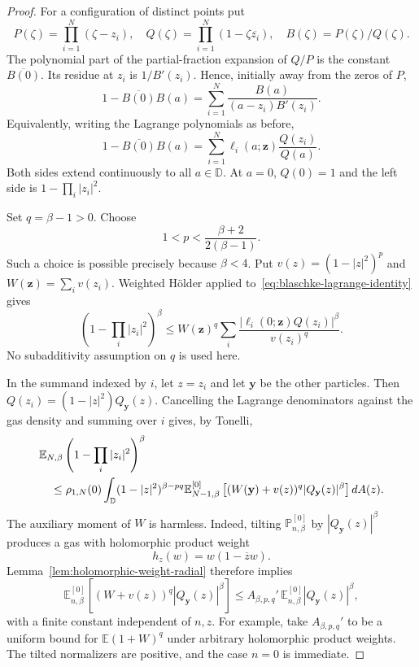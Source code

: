\documentclass[11pt,a4paper]{article}
\numberwithin{equation}{section}
\theoremstyle{definition}
\theoremstyle{remark}
\newcommand{\D}{\mathbb D}
\begin{document}
\begin{proof}
For a configuration of distinct points put
\[
 P(\zeta)=\prod_{i=1}^N(\zeta-z_i),\quad
 Q(\zeta)=\prod_{i=1}^N(1-\zeta\overline{z_i}),\quad
 B(\zeta)=P(\zeta)/Q(\zeta).
\]
The polynomial part of the partial-fraction expansion of $Q/P$
is the constant $\overline{B(0)}$. Its residue at $z_i$ is
$1/B'(z_i)$. Hence, initially away from the zeros of $P$,
\[
 1-\overline{B(0)}B(a)
 =\sum_{i=1}^N\frac{B(a)}{(a-z_i)B'(z_i)}.
\]
Equivalently, writing the Lagrange polynomials as before,
\begin{equation}
 1-\overline{B(0)}B(a)
 =\sum_{i=1}^N\ell_i(a;\mathbf z)\frac{Q(z_i)}{Q(a)}.
 \label{eq:blaschke-lagrange-identity}
\end{equation}
Both sides extend continuously to all $a\in\D$. At $a=0$,
$Q(0)=1$ and the left side is $1-\prod_i|z_i|^2$.

Set $q=\beta-1>0$. Choose
\begin{equation}
 1<p<\frac{\beta+2}{2(\beta-1)}.
 \label{eq:blaschke-weight-range}
\end{equation}
Such a choice is possible precisely because $\beta<4$. Put
$v(z)=(1-|z|^2)^p$ and $W(\mathbf z)=\sum_i v(z_i)$.
Weighted H\"older applied to~\eqref{eq:blaschke-lagrange-identity}
gives
\[
 \left(1-\prod_i|z_i|^2\right)^\beta
 \le W(\mathbf z)^q
 \sum_i\frac{|\ell_i(0;\mathbf z)Q(z_i)|^\beta}{v(z_i)^q}.
\]
No subadditivity assumption on $q$ is used here.

In the summand indexed by $i$, let $z=z_i$ and let $\mathbf y$
be the other particles. Then
$Q(z_i)=(1-|z|^2)Q_{\mathbf y}(z)$. Cancelling the Lagrange
denominators against the gas density and summing over $i$ gives,
by Tonelli,
\begin{align}
 &\mathbb E_{N,\beta}
       \left(1-\prod_i|z_i|^2\right)^\beta\notag\\
 &\quad\le\rho_{1,N}(0)
 \int_\D (1-|z|^2)^{\beta-pq}
 \mathbb E_{N-1,\beta}^{[0]}
 \left[(W(\mathbf y)+v(z))^q|Q_{\mathbf y}(z)|^\beta\right]dA(z).
 \label{eq:blaschke-exact-palm-bound}
\end{align}
The auxiliary moment of $W$ is harmless. Indeed, tilting
$\mathbb P_{n,\beta}^{[0]}$ by $|Q_{\mathbf y}(z)|^\beta$
produces a gas with holomorphic product weight
\[
 h_z(w)=w(1-\overline z w).
\]
Lemma~\ref{lem:holomorphic-weight-radial} therefore implies
\begin{equation}
 \mathbb E_{n,\beta}^{[0]}
 \left[(W+v(z))^q|Q_{\mathbf y}(z)|^\beta\right]
 \le A_{\beta,p,q}'\,
       \mathbb E_{n,\beta}^{[0]}|Q_{\mathbf y}(z)|^\beta,
 \label{eq:blaschke-weighted-moment-removal}
\end{equation}
with a finite constant independent of $n,z$. For example, take
$A_{\beta,p,q}'$ to be a uniform bound for
$\mathbb E(1+W)^q$ under arbitrary holomorphic product weights.
The tilted normalizers are positive, and the case $n=0$ is immediate.


\end{proof}
\end{document}
